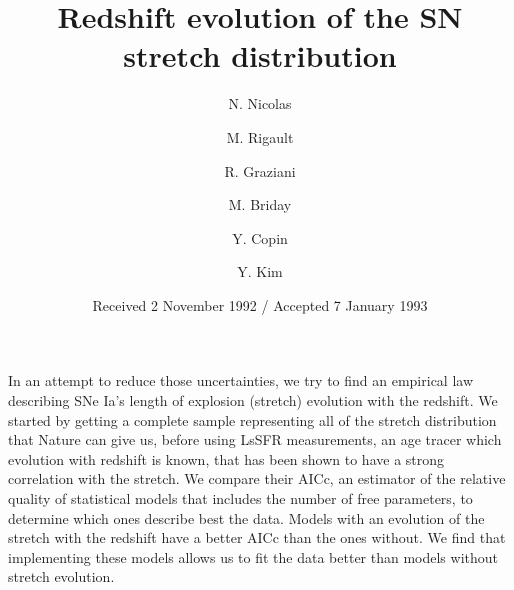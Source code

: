 \documentclass[]{aa} %
\begin{document}
\title{Redshift evolution of the SN stretch distribution}


\author{N. Nicolas
    \and M. Rigault
    \and R. Graziani     
    \and M. Briday
    \and Y. Copin    
    \and Y. Kim
}



\date{Received 2 November 1992 / Accepted 7 January 1993}

    {In an attempt to reduce those uncertainties, we try to find an empirical
    law describing SNe Ia's length of explosion (stretch) evolution with the
redshift.}
    {We started by getting a complete sample representing all of the stretch
        distribution that Nature can give us, before using LsSFR measurements,
        an age tracer which evolution with redshift is known, that has been
        shown to have a strong correlation with the stretch. We compare their
        AICc, an estimator of the relative quality of statistical models that
    includes the number of free parameters, to determine which ones describe
best the data.}
    {Models with an evolution of the stretch with the redshift have a better
    AICc than the ones without.}
    {We find that implementing these models allows us to fit the data better
    than models without stretch evolution.}

\maketitle
\end{document}
